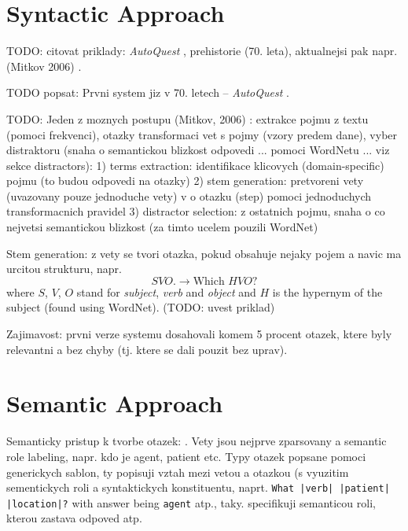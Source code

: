 \documentclass[a4paper, 12pt, twoside]{fithesis2}		%
\renewcommand{\_}{\leavevmode \kern0.07em\vbox{\hrule width0.4em}}
\begin{document}
\section{Syntactic Approach}
\label{sec:questions-syntactically}

TODO: citovat priklady: \textit{AutoQuest} \cite{questions-wolfe}, prehistorie (70. leta), aktualnejsi pak napr. (Mitkov 2006) \cite{question-gen-mitkov}.

TODO popsat: Prvni system jiz v 70. letech -- \textit{AutoQuest} \cite{questions-wolfe}.

TODO: Jeden z moznych postupu (Mitkov, 2006) \cite{question-gen-mitkov}:
extrakce pojmu z textu (pomoci frekvenci), otazky transformaci vet s pojmy (vzory predem dane), vyber distraktoru (snaha o semantickou blizkost odpovedi ... pomoci WordNetu ... viz sekce distractors):
1) terms extraction: identifikace klicovych (domain-specific) pojmu (to budou odpovedi na otazky)
2) stem generation: pretvoreni vety (uvazovany pouze jednoduche vety) v o otazku (step) pomoci jednoduchych transformacnich pravidel
3) distractor selection: z ostatnich pojmu, snaha o co nejvetsi semantickou blizkost (za timto ucelem pouzili WordNet)


Stem generation: z vety se tvori otazka, pokud obsahuje nejaky pojem a navic ma urcitou strukturu, napr.
$$
S V O \text{.} \longrightarrow \text{Which } H V O \text{?}
$$
where $S$, $V$, $O$ stand for \textit{subject}, \textit{verb} and \textit{object} and $H$ is the hypernym of the subject (found using WordNet). (TODO: uvest priklad)

Zajimavost: prvni verze systemu dosahovali komem 5 procent otazek, ktere byly relevantni a bez chyby (tj. ktere se dali pouzit bez uprav).


\section{Semantic Approach}
\label{sec:questions-semantically}

Semanticky pristup k tvorbe otazek: \cite{questions-eval}.
Vety jsou nejprve zparsovany a semantic role labeling, napr. kdo je agent, patient etc.
Typy otazek popsane pomoci generickych sablon, ty popisuji vztah mezi vetou a otazkou (s vyuzitim sementickych roli a syntaktickych konstituentu, naprt. \texttt{What |verb| |patient| |location|?} with answer being \texttt{agent} atp., taky. specifikuji semanticou roli, kterou zastava odpoved atp.
\end{document}
